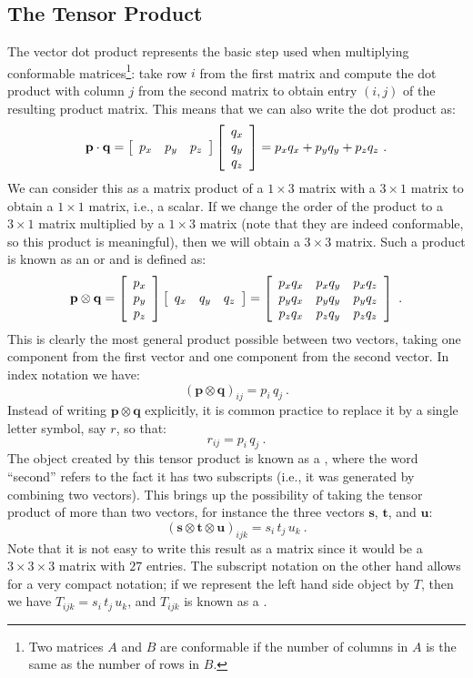 \subsection{The Tensor Product}
The vector dot product represents the basic step used when multiplying conformable matrices\footnote{Two matrices $A$ and $B$ are conformable if the number of columns in $A$ is the same as the number of rows in $B$.}: take row $i$ from the first matrix and compute the dot product with column $j$ from the second matrix to obtain entry $(i,j)$ of the resulting product matrix. This means that we can also write the dot product as:
\begin{equation}
	\mathbf{p}\cdot\mathbf{q} = \left[\begin{array}{ccc} p_x & p_y & p_z \end{array}\right]\left[\begin{array}{c} q_x \\ q_y \\ q_z \end{array}\right] = p_xq_x+p_yq_y+p_zq_z\ .
\end{equation}
We can consider this as a matrix product of a $1\times 3$ matrix with a $3\times 1$ matrix to obtain a $1\times 1$ matrix, i.e., a scalar. If we change the order of the product to a $3\times 1$ matrix multiplied by a $1\times 3$ matrix (note that they are indeed conformable, so this product is meaningful), then we will obtain a $3\times 3$ matrix.  Such a product is known as an  or  and is defined as:
\begin{equation}
	\mathbf{p}\otimes\mathbf{q} = \columnthree{p_x}{p_y}{p_z}\rowthree{q_x}{q_y}{q_z}=\matrixtbtb{p_xq_x}{p_xq_y}{p_xq_z}{p_yq_x}{p_yq_y}{p_yq_z}{p_zq_x}{p_zq_y}{p_zq_z}\ .
\end{equation}
This is clearly the most general product possible between two vectors, taking one component from the first vector and one component from the second vector.  In index notation we have:
\begin{equation}
	(\mathbf{p}\otimes\mathbf{q})_{ij} = p_i\, q_j\ .
\end{equation}
Instead of writing $\mathbf{p}\otimes\mathbf{q}$ explicitly, it is common practice to replace it by a single letter symbol, say $r$, so that:
\begin{equation}
	r_{ij} = p_i\, q_j\ .
\end{equation}
The object created by this tensor product is known as a , where the word ``second'' refers to the fact it has two subscripts (i.e., it was generated by combining two vectors). This brings up the possibility of taking the tensor product of more than two vectors, for instance the three vectors $\mathbf{s}$, $\mathbf{t}$, and $\mathbf{u}$:
\begin{equation}
	(\mathbf{s}\otimes\mathbf{t}\otimes\mathbf{u})_{ijk} = s_i\,t_j\,u_k\ .
\end{equation}
Note that it is not easy to write this result as a matrix since it would be a $3\times 3\times 3$ matrix with $27$ entries. The subscript notation on the other hand allows for a very compact notation; if we represent the left hand side object by $T$, then we have $T_{ijk}=s_i\,t_j\,u_k$, and $T_{ijk}$ is known as a .

